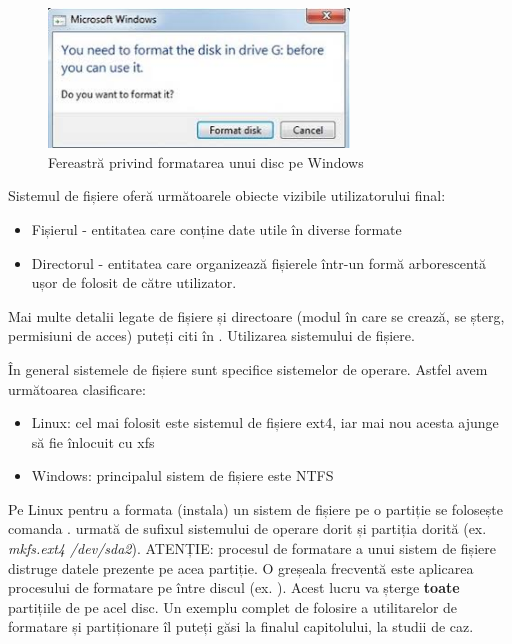 \begin{figure}[!htbp]
	\centering
	\includegraphics[width=8cm]{chapters/10-storage/img/format-disk-img.png}
	\caption{Fereastră privind formatarea unui disc pe Windows}
	\label{fig:storage-format-disk}
\end{figure}

Sistemul de fișiere oferă următoarele obiecte vizibile utilizatorului final:

\begin{itemize}
	\item Fișierul - entitatea care conține date utile în diverse formate
	\item Directorul - entitatea care organizează fișierele într-un formă
		arborescentă ușor de folosit de către utilizator.
\end{itemize}

Mai multe detalii legate de fișiere și directoare (modul în care se crează, se
șterg, permisiuni de acces) puteți citi în
. Utilizarea sistemului de
fișiere.

În general sistemele de fișiere sunt specifice sistemelor de operare. Astfel avem următoarea clasificare:

\begin{itemize}
	\item Linux: cel mai folosit este sistemul de fișiere ext4, iar mai nou
		acesta ajunge să fie înlocuit cu xfs
	\item Windows: principalul sistem de fișiere este NTFS
\end{itemize}

Pe Linux pentru a formata (instala) un sistem de fișiere pe o partiție se
folosește comanda . urmată de sufixul sistemului de operare dorit și
partiția dorită (ex. \textit{mkfs.ext4 /dev/sda2}). ATENȚIE: procesul de
formatare a unui sistem de fișiere distruge datele prezente pe acea partiție. O
greșeala frecventă este aplicarea procesului de formatare pe între discul (ex.
). Acest lucru va șterge \textbf{toate} partițiile de pe
acel disc. Un exemplu complet de folosire a utilitarelor de formatare și
partiționare îl puteți găsi la finalul capitolului, la studii de caz.

